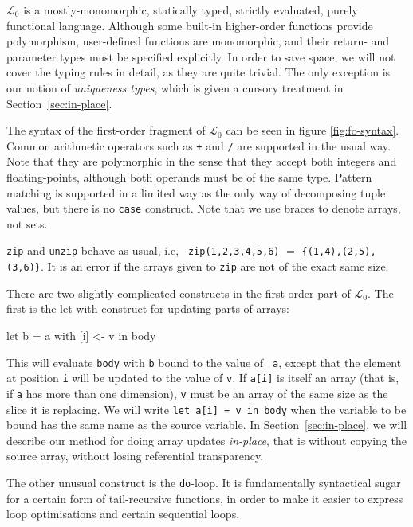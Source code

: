 \documentclass{sigplanconf}  %
\newcommand{\LO}{$\mathcal{L}_0$}
\begin{document}
\LO{} is a mostly-monomorphic, statically typed, strictly evaluated,
purely functional language.  Although some built-in higher-order
functions provide polymorphism, user-defined functions are
monomorphic, and their return- and parameter types must be specified
explicitly.  In order to save space, we will not cover the typing
rules in detail, as they are quite trivial.  The only exception is our
notion of {\em uniqueness types}, which is given a cursory treatment
in Section~\ref{sec:in-place}.

The syntax of the first-order fragment of \LO{} can be seen in figure
\ref{fig:fo-syntax}.  Common arithmetic operators such as {\tt +} and
{\tt /} are supported in the usual way.  Note that they are
polymorphic in the sense that they accept both integers and
floating-points, although both operands must be of the same type.
Pattern matching is supported in a limited way as the only way of
decomposing tuple values, but there is no {\tt case} construct.  Note
that we use braces to denote arrays, not sets.

{\tt zip} and {\tt unzip} behave as usual, i.e, {\tt
  zip({1,2,3},{4,5,6})} $=$ {\tt \{{(1,4),(2,5),(3,6)}\}}.  It
is an error if the arrays given to {\tt zip} are not of the exact same
size.

There are two slightly complicated constructs in the first-order part
of \LO{}.  The first is the let-with construct for updating parts of
arrays:

\begin{colorcode}
let b = a with [i] <- v in body
\end{colorcode}

This will evaluate {\tt body} with {\tt b} bound to the value of {\tt
  a}, except that the element at position {\tt i} will be updated to
the value of {\tt v}.  If {\tt a[i]} is itself an array (that is, if
{\tt a} has more than one dimension), {\tt v} must be an array of the
same size as the slice it is replacing.  We will write {\tt let a[i] =
  v in body} when the variable to be bound has the same name as the
source variable.  In Section~\ref{sec:in-place}, we will describe our
method for doing array updates {\em in-place}, that is without copying
the source array, without losing referential transparency.

The other unusual construct is the {\tt do}-loop.  It is fundamentally
syntactical sugar for a certain form of tail-recursive functions, in
order to make it easier to express loop optimisations and certain
sequential loops.
\end{document}
